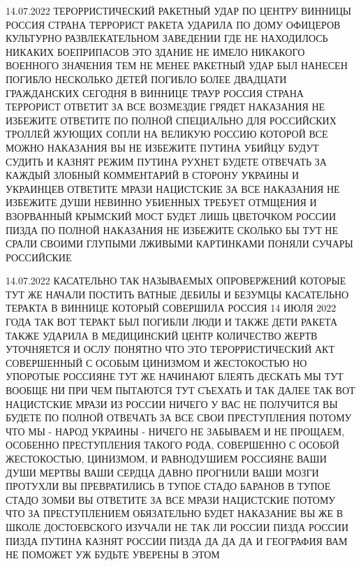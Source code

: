 14.07.2022
ТЕРОРРИСТИЧЕСКИЙ РАКЕТНЫЙ УДАР ПО ЦЕНТРУ ВИННИЦЫ РОССИЯ СТРАНА ТЕРРОРИСТ РАКЕТА
УДАРИЛА ПО ДОМУ ОФИЦЕРОВ КУЛЬТУРНО РАЗВЛЕКАТЕЛЬНОМ ЗАВЕДЕНИИ ГДЕ НЕ НАХОДИЛОСЬ
НИКАКИХ БОЕПРИПАСОВ ЭТО ЗДАНИЕ НЕ ИМЕЛО НИКАКОГО ВОЕННОГО ЗНАЧЕНИЯ ТЕМ НЕ МЕНЕЕ
РАКЕТНЫЙ УДАР БЫЛ НАНЕСЕН ПОГИБЛО НЕСКОЛЬКО ДЕТЕЙ ПОГИБЛО БОЛЕЕ ДВАДЦАТИ
ГРАЖДАНСКИХ СЕГОДНЯ В ВИННИЦЕ ТРАУР РОССИЯ СТРАНА ТЕРРОРИСТ ОТВЕТИТ ЗА ВСЕ
ВОЗМЕЗДИЕ ГРЯДЕТ НАКАЗАНИЯ НЕ ИЗБЕЖИТЕ ОТВЕТИТЕ ПО ПОЛНОЙ СПЕЦИАЛЬНО ДЛЯ
РОССИЙСКИХ ТРОЛЛЕЙ ЖУЮЩИХ СОПЛИ НА ВЕЛИКУЮ РОССИЮ КОТОРОЙ ВСЕ МОЖНО НАКАЗАНИЯ
ВЫ НЕ ИЗБЕЖИТЕ ПУТИНА УБИЙЦУ БУДУТ СУДИТЬ И КАЗНЯТ РЕЖИМ ПУТИНА РУХНЕТ БУДЕТЕ
ОТВЕЧАТЬ ЗА КАЖДЫЙ ЗЛОБНЫЙ КОММЕНТАРИЙ В СТОРОНУ УКРАИНЫ И УКРАИНЦЕВ ОТВЕТИТЕ
МРАЗИ НАЦИСТСКИЕ ЗА ВСЕ НАКАЗАНИЯ НЕ ИЗБЕЖИТЕ ДУШИ НЕВИННО УБИЕННЫХ ТРЕБУЕТ
ОТМЩЕНИЯ И ВЗОРВАННЫЙ КРЫМСКИЙ МОСТ БУДЕТ ЛИШЬ ЦВЕТОЧКОМ РОССИИ ПИЗДА ПО ПОЛНОЙ
НАКАЗАНИЯ НЕ ИЗБЕЖИТЕ СКОЛЬКО БЫ ТУТ НЕ СРАЛИ СВОИМИ ГЛУПЫМИ ЛЖИВЫМИ КАРТИНКАМИ
ПОНЯЛИ СУЧАРЫ РОССИЙСКИЕ

14.07.2022
КАСАТЕЛЬНО ТАК НАЗЫВАЕМЫХ ОПРОВЕРЖЕНИЙ КОТОРЫЕ ТУТ ЖЕ НАЧАЛИ ПОСТИТЬ ВАТНЫЕ
ДЕБИЛЫ И БЕЗУМЦЫ КАСАТЕЛЬНО ТЕРАКТА В ВИННИЦЕ КОТОРЫЙ СОВЕРШИЛА РОССИЯ 14 ИЮЛЯ
2022 ГОДА ТАК ВОТ ТЕРАКТ БЫЛ ПОГИБЛИ ЛЮДИ И ТАКЖЕ ДЕТИ РАКЕТА ТАКЖЕ УДАРИЛА В
МЕДИЦИНСКИЙ ЦЕНТР КОЛИЧЕСТВО ЖЕРТВ УТОЧНЯЕТСЯ И ОСЛУ ПОНЯТНО ЧТО ЭТО
ТЕРОРРИСТИЧЕСКИЙ АКТ СОВЕРШЕННЫЙ С ОСОБЫМ ЦИНИЗМОМ И ЖЕСТОКОСТЬЮ НО УПОРОТЫЕ
РОССИЯНЕ ТУТ ЖЕ НАЧИНАЮТ БЛЕЯТЬ ДЕСКАТЬ МЫ ТУТ ВООБЩЕ НИ ПРИ ЧЕМ ПЫТАЮТСЯ ТУТ
СЪЕХАТЬ И ТАК ДАЛЕЕ ТАК ВОТ НАЦИСТСКИЕ МРАЗИ ИЗ РОССИИ НИЧЕГО У ВАС НЕ
ПОЛУЧИТСЯ ВЫ БУДЕТЕ ПО ПОЛНОЙ ОТВЕЧАТЬ ЗА ВСЕ СВОИ ПРЕСТУПЛЕНИЯ ПОТОМУ ЧТО МЫ -
НАРОД УКРАИНЫ - НИЧЕГО НЕ ЗАБЫВАЕМ И НЕ ПРОЩАЕМ, ОСОБЕННО ПРЕСТУПЛЕНИЯ ТАКОГО
РОДА, СОВЕРШЕННО С ОСОБОЙ ЖЕСТОКОСТЬЮ, ЦИНИЗМОМ, И РАВНОДУШИЕМ РОССИЯНЕ ВАШИ
ДУШИ МЕРТВЫ ВАШИ СЕРДЦА ДАВНО ПРОГНИЛИ ВАШИ МОЗГИ ПРОТУХЛИ ВЫ ПРЕВРАТИЛИСЬ В
ТУПОЕ СТАДО БАРАНОВ В ТУПОЕ СТАДО ЗОМБИ ВЫ ОТВЕТИТЕ ЗА ВСЕ МРАЗИ НАЦИСТСКИЕ
ПОТОМУ ЧТО ЗА ПРЕСТУПЛЕНИЕМ ОБЯЗАТЕЛЬНО БУДЕТ НАКАЗАНИЕ ВЫ ЖЕ В ШКОЛЕ
ДОСТОЕВСКОГО ИЗУЧАЛИ НЕ ТАК ЛИ РОССИИ ПИЗДА РОССИИ ПИЗДА ПУТИНА КАЗНЯТ РОССИИ
ПИЗДА ДА ДА ДА И ГЕОГРАФИЯ ВАМ НЕ ПОМОЖЕТ УЖ БУДЬТЕ УВЕРЕНЫ В ЭТОМ

